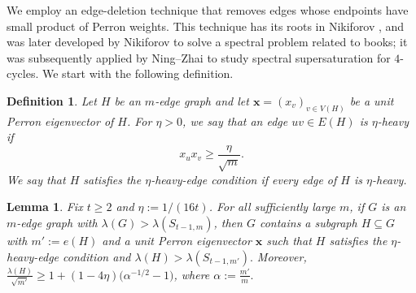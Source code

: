 \documentclass[10pt,a4paper]{amsart}
\newtheorem{lemma}[theorem]{Lemma}
\newtheorem{definition}[theorem]{Definition}
\begin{document}
We employ an edge-deletion technique that removes edges whose endpoints have small product of Perron weights. 
This technique has its roots in Nikiforov  \cite{Nikiforov2007C4FreeMaxSpectralRadius}, 
and was later developed by Nikiforov \cite{Niki2021} to solve a spectral problem related to books; it was subsequently applied by Ning--Zhai \cite{NZ2021b} to study spectral supersaturation for \(4\)-cycles. 
We start with the following definition.

\begin{definition} \label{def:heavy-edge}
Let $H$ be an $m$-edge graph and let $\bm{x}=(x_v)_{v\in V(H)}$ be a unit Perron eigenvector of $H$.
For $\eta>0$, we say that an edge $uv\in E(H)$ is \emph{$\eta$-heavy} if
\[
        x_u x_v \ge \frac{\eta}{\sqrt m}.
\]
We say that $H$ satisfies the \emph{$\eta$-heavy-edge condition} if every edge of $H$ is $\eta$-heavy. 
\end{definition}

\begin{lemma} \label{lem:lemmaA-pruning}
Fix $t\ge 2$ and $\eta:=1/(16t)$.
For all sufficiently large $m$, if $G$ is an $m$-edge graph with $\lambda(G) > \lambda(S_{t-1,m})$, then $G$ contains a subgraph $H\subseteq G$ with
$m':=e(H)$ and a unit Perron eigenvector $\bm{x}$ such that $H$ satisfies the $\eta$-heavy-edge condition and $\lambda(H)>\lambda(S_{t-1,m'}).$
Moreover, $\frac{\lambda(H)}{\sqrt{m'}}
        \ge
        1+(1-4\eta)\bigl(\alpha^{-1/2}-1\bigr)$, where $\alpha:=\frac{m'}{m}.$
\end{lemma}
\end{document}
